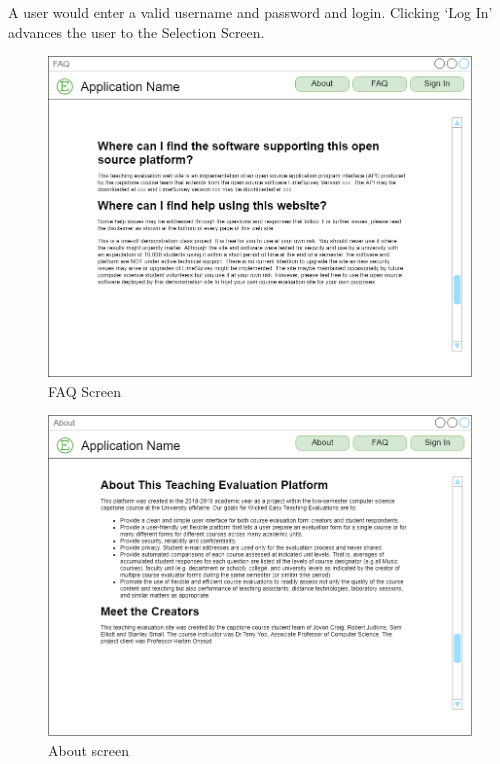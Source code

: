 \documentclass{article}
\begin{document}
A user would enter a valid username and password and login. Clicking `Log In' advances the user to the Selection Screen.

\begin{center}
\begin{figure}[H]
    \centering
    \caption{FAQ Screen}
    \includegraphics[scale=.35]{images/faq_screen.png}
\end{figure}
\end{center}

\begin{center}
\begin{figure}[H]
    \centering
    \caption{About screen}
    \includegraphics[scale=.35]{images/about_screen.png}
\end{figure}
\end{center}
\end{document}
